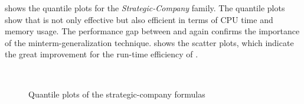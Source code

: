  shows the quantile plots for the \textit{Strategic-Company} family.
The quantile plots show that \ressat is not only effective but also efficient
in terms of CPU time and memory usage.
The performance gap between \ressat and \ressatb again confirms the importance of the minterm-generalization technique.
 shows the scatter plots,
which indicate the great improvement for the run-time efficiency of \ressat.

\begin{figure}[hp]
    \centering
    \\
    \caption{Quantile plots of the strategic-company formulas}
    \label{fig:ressat-quantile-strategic}
\end{figure}

